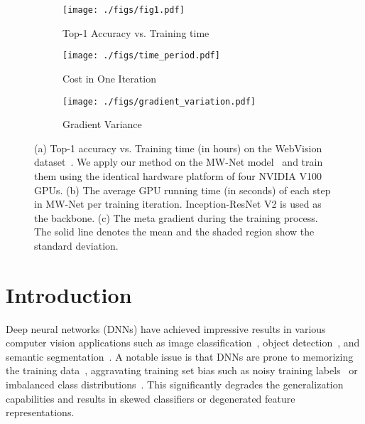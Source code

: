 \documentclass[final]{cvpr}
\begin{document}
\begin{figure}[th]
\begin{subfigure}{.45\textwidth}
\centering
\texttt{[image: ./figs/fig1.pdf]}
\footnotesize\caption{Top-1 Accuracy vs. Training time}
\end{subfigure}
\begin{subfigure}{.23\textwidth}
\texttt{[image: ./figs/time\_period.pdf]}
\footnotesize\caption{Cost in One Iteration}
\end{subfigure}
\begin{subfigure}{.23\textwidth}
\texttt{[image: ./figs/gradient\_variation.pdf]}
\footnotesize\caption{Gradient Variance}
\end{subfigure}
\caption{(a) Top-1 accuracy vs. Training time (in hours) on the WebVision dataset~\cite{li2017webvision}. We apply our method on the MW-Net model~\cite{shu2019meta} and train them using the identical hardware platform of four NVIDIA V100 GPUs. (b) The average GPU running time (in seconds) of each step in MW-Net per training iteration. Inception-ResNet V2 is used as the backbone. (c) The meta gradient during the training process. The solid line denotes the mean and the shaded region show the standard deviation.}
\label{fig:motivation}
\end{figure}


\section{Introduction}
Deep neural networks (DNNs) have achieved impressive results in various computer vision applications such as image classification~\cite{krizhevsky2012imagenet,he2016deep}, object detection~\cite{ren2016faster,redmon2016you,liu2016ssd}, and semantic segmentation~\cite{he2017mask}. 
A notable issue is that DNNs are prone to memorizing the training data~\cite{zhang2016understanding, tanaka2018joint}, aggravating training set bias such as noisy training labels~\cite{zhang2016understanding} or imbalanced class distributions~\cite{he2009learning,zhu2020inflated}. This significantly degrades the generalization capabilities and results in skewed classifiers or degenerated feature representations.
\end{document}
